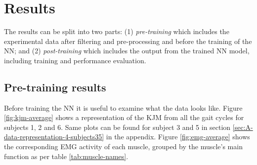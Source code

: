\documentclass[../main.tex]{subfiles}
\begin{document}
\chapter{Results}
\label{sec:results}
The results can be split into two parts: (1) \textit{pre-training} which includes the experimental data after filtering and pre-processing and before the training of the \ac{NN}; and (2) \textit{post-training} which includes the output from the trained \ac{NN} model, including training and performance evaluation.

\section{Pre-training results}
\label{sec:results_pre-training-results}
Before training the \ac{NN} it is useful to examine what the data looks like.
Figure \ref{fig:kjm-average} shows a representation of the \ac{KJM} from all the gait cycles for subjects 1, 2 and 6.
Same plots can be found for subject 3 and 5 in section \ref{sec:A-data-representation-4-subjects35} in the appendix. 
Figure \ref{fig:emg-average} shows the corresponding \ac{EMG} activity of each muscle, grouped by the muscle's main function as per table \ref{tab:muscle-names}.
\end{document}
